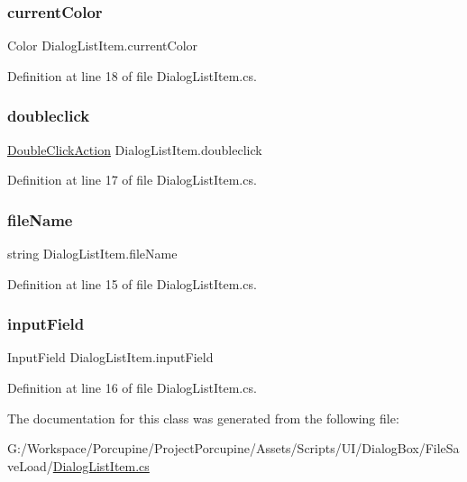 \subsubsection{\texorpdfstring{current\+Color}{currentColor}}
{\footnotesize\ttfamily Color Dialog\+List\+Item.\+current\+Color}



Definition at line 18 of file Dialog\+List\+Item.\+cs.

\mbox{\label{class_dialog_list_item_a9c33e1c902cc64c5e25cb67f01136bbd}} 
\subsubsection{\texorpdfstring{doubleclick}{doubleclick}}
{\footnotesize\ttfamily \hyperlink{class_dialog_list_item_a8e8ed693bc47b70037d6c32b56ff9509}{Double\+Click\+Action} Dialog\+List\+Item.\+doubleclick}



Definition at line 17 of file Dialog\+List\+Item.\+cs.

\mbox{\label{class_dialog_list_item_a983b526b4fb79b0b1f4cbb3c4cb19172}} 
\subsubsection{\texorpdfstring{file\+Name}{fileName}}
{\footnotesize\ttfamily string Dialog\+List\+Item.\+file\+Name}



Definition at line 15 of file Dialog\+List\+Item.\+cs.

\mbox{\label{class_dialog_list_item_ab65bf881b76d62d025e51ed041fa9e5f}} 
\subsubsection{\texorpdfstring{input\+Field}{inputField}}
{\footnotesize\ttfamily Input\+Field Dialog\+List\+Item.\+input\+Field}



Definition at line 16 of file Dialog\+List\+Item.\+cs.



The documentation for this class was generated from the following file\+:\begin{DoxyCompactItemize}
\item 
G\+:/\+Workspace/\+Porcupine/\+Project\+Porcupine/\+Assets/\+Scripts/\+U\+I/\+Dialog\+Box/\+File\+Save\+Load/\hyperlink{_dialog_list_item_8cs}{Dialog\+List\+Item.\+cs}\end{DoxyCompactItemize}
